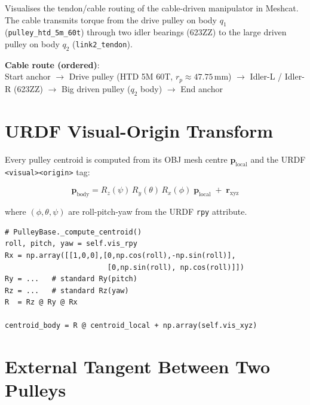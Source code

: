 \documentclass[11pt, a4paper]{article}
\begin{document}
Visualises the tendon/cable routing of the cable-driven manipulator in
Meshcat.  The cable transmits torque from the drive pulley on body $q_1$
(\texttt{pulley\_htd\_5m\_60t}) through two idler bearings (623ZZ) to the
large driven pulley on body $q_2$ (\texttt{link2\_tendon}).

\medskip
\begin{mdframed}
\textbf{Cable route (ordered)}:\\
Start anchor $\xrightarrow{\;}$
Drive pulley (HTD 5M 60T, $r_p \approx 47.75\,\text{mm}$) $\xrightarrow{\;}$
Idler-L \;/\; Idler-R (623ZZ) $\xrightarrow{\;}$
Big driven pulley ($q_2$ body) $\xrightarrow{\;}$
End anchor
\end{mdframed}

\section{URDF Visual-Origin Transform}

Every pulley centroid is computed from its OBJ mesh centre
$\bm{p}_{\text{local}}$ and the URDF \texttt{<visual><origin>} tag:

\begin{equation}
  \bm{p}_{\text{body}}
  = R_z(\psi)\,R_y(\theta)\,R_x(\phi)\;\bm{p}_{\text{local}}
  \;+\; \bm{r}_{\text{xyz}}
  \label{eq:vis-origin}
\end{equation}

where $(\phi,\theta,\psi)$ are roll-pitch-yaw from the URDF \texttt{rpy}
attribute.

\begin{lstlisting}
# PulleyBase._compute_centroid()
roll, pitch, yaw = self.vis_rpy
Rx = np.array([[1,0,0],[0,np.cos(roll),-np.sin(roll)],
                        [0,np.sin(roll), np.cos(roll)]])
Ry = ...   # standard Ry(pitch)
Rz = ...   # standard Rz(yaw)
R  = Rz @ Ry @ Rx

centroid_body = R @ centroid_local + np.array(self.vis_xyz)
\end{lstlisting}

\section{External Tangent Between Two Pulleys}
\end{document}
